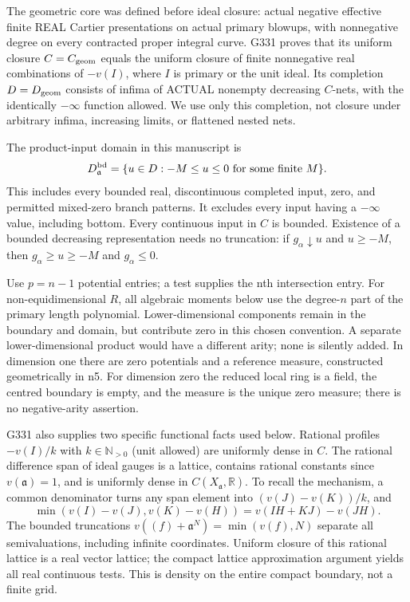 \documentclass[
  11pt,
]{article}
\begin{document}
The geometric core was defined before ideal closure: actual negative
effective finite REAL Cartier presentations on actual primary blowups,
with nonnegative degree on every contracted proper integral curve. G331
proves that its uniform closure \(C=C_{\rm geom}\) equals the uniform
closure of finite nonnegative real combinations of \(-v(I)\), where
\(I\) is primary or the unit ideal. Its completion \(D=D_{\rm geom}\)
consists of infima of ACTUAL nonempty decreasing \(C\)-nets, with the
identically \(-\infty\) function allowed. We use only this completion,
not closure under arbitrary infima, increasing limits, or flattened
nested nets.

The product-input domain in this manuscript is
\[D^{\rm bd}_{\mathfrak a}=\{u\in D:-M\le u\le0\text{ for some finite }M\}.\]
This includes every bounded real, discontinuous completed input, zero,
and permitted mixed-zero branch patterns. It excludes every input having
a \(-\infty\) value, including bottom. Every continuous input in \(C\)
is bounded. Existence of a bounded decreasing representation needs no
truncation: if \(g_\alpha\downarrow u\) and \(u\ge-M\), then
\(g_\alpha\ge u\ge-M\) and \(g_\alpha\le0\).

Use \(p=n-1\) potential entries; a test supplies the nth intersection
entry. For non-equidimensional \(R\), all algebraic moments below use
the degree-\(n\) part of the primary length polynomial.
Lower-dimensional components remain in the boundary and domain, but
contribute zero in this chosen convention. A separate lower-dimensional
product would have a different arity; none is silently added. In
dimension one there are zero potentials and a reference measure,
constructed geometrically in n5. For dimension zero the reduced local
ring is a field, the centred boundary is empty, and the measure is the
unique zero measure; there is no negative-arity assertion.

G331 also supplies two specific functional facts used below. Rational
profiles \(-v(I)/k\) with \(k\in\mathbb N_{>0}\) (unit allowed) are
uniformly dense in \(C\). The rational difference span of ideal gauges
is a lattice, contains rational constants since \(v(\mathfrak a)=1\),
and is uniformly dense in \(C(X_{\mathfrak a},\mathbb R)\). To recall
the mechanism, a common denominator turns any span element into
\((v(J)-v(K))/k\), and \[\min(v(I)-v(J),v(K)-v(H))=v(IH+KJ)-v(JH).\] The
bounded truncations \(v((f)+\mathfrak a^N)=\min(v(f),N)\) separate all
semivaluations, including infinite coordinates. Uniform closure of this
rational lattice is a real vector lattice; the compact lattice
approximation argument yields all real continuous tests. This is density
on the entire compact boundary, not a finite grid.
\end{document}
